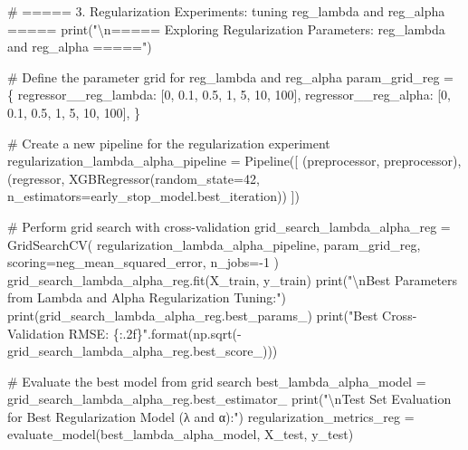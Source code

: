 \documentclass[
  letterpaper,
  DIV=11,
  numbers=noendperiod]{scrreprt}
\newenvironment{Shaded}{\begin{snugshade}}{\end{snugshade}}
\newcommand{\BuiltInTok}[1]{\textcolor[rgb]{0.00,0.23,0.31}{#1}}
\newcommand{\CharTok}[1]{\textcolor[rgb]{0.13,0.47,0.30}{#1}}
\newcommand{\CommentTok}[1]{\textcolor[rgb]{0.37,0.37,0.37}{#1}}
\newcommand{\DecValTok}[1]{\textcolor[rgb]{0.68,0.00,0.00}{#1}}
\newcommand{\FloatTok}[1]{\textcolor[rgb]{0.68,0.00,0.00}{#1}}
\newcommand{\NormalTok}[1]{\textcolor[rgb]{0.00,0.23,0.31}{#1}}
\newcommand{\OperatorTok}[1]{\textcolor[rgb]{0.37,0.37,0.37}{#1}}
\newcommand{\SpecialCharTok}[1]{\textcolor[rgb]{0.37,0.37,0.37}{#1}}
\newcommand{\StringTok}[1]{\textcolor[rgb]{0.13,0.47,0.30}{#1}}
\begin{document}
\begin{Shaded}
\begin{Highlighting}[]
\CommentTok{\# ===== 3. Regularization Experiments: tuning reg\_lambda and reg\_alpha =====}
\BuiltInTok{print}\NormalTok{(}\StringTok{"}\CharTok{\textbackslash{}n}\StringTok{===== Exploring Regularization Parameters: reg\_lambda and reg\_alpha ====="}\NormalTok{)}

\CommentTok{\# Define the parameter grid for reg\_lambda and reg\_alpha}
\NormalTok{param\_grid\_reg }\OperatorTok{=}\NormalTok{ \{}
    \StringTok{\textquotesingle{}regressor\_\_reg\_lambda\textquotesingle{}}\NormalTok{: [}\DecValTok{0}\NormalTok{, }\FloatTok{0.1}\NormalTok{, }\FloatTok{0.5}\NormalTok{, }\DecValTok{1}\NormalTok{, }\DecValTok{5}\NormalTok{, }\DecValTok{10}\NormalTok{, }\DecValTok{100}\NormalTok{],}
    \StringTok{\textquotesingle{}regressor\_\_reg\_alpha\textquotesingle{}}\NormalTok{: [}\DecValTok{0}\NormalTok{, }\FloatTok{0.1}\NormalTok{, }\FloatTok{0.5}\NormalTok{, }\DecValTok{1}\NormalTok{, }\DecValTok{5}\NormalTok{, }\DecValTok{10}\NormalTok{, }\DecValTok{100}\NormalTok{],}
\NormalTok{\}}

\CommentTok{\# Create a new pipeline for the regularization experiment}
\NormalTok{regularization\_lambda\_alpha\_pipeline }\OperatorTok{=}\NormalTok{ Pipeline([}
\NormalTok{    (}\StringTok{\textquotesingle{}preprocessor\textquotesingle{}}\NormalTok{, preprocessor),}
\NormalTok{    (}\StringTok{\textquotesingle{}regressor\textquotesingle{}}\NormalTok{, XGBRegressor(random\_state}\OperatorTok{=}\DecValTok{42}\NormalTok{, n\_estimators}\OperatorTok{=}\NormalTok{early\_stop\_model.best\_iteration))}
\NormalTok{])}

\CommentTok{\# Perform grid search with cross{-}validation}
\NormalTok{grid\_search\_lambda\_alpha\_reg }\OperatorTok{=}\NormalTok{ GridSearchCV(}
\NormalTok{    regularization\_lambda\_alpha\_pipeline,}
\NormalTok{    param\_grid\_reg,}
\NormalTok{    scoring}\OperatorTok{=}\StringTok{\textquotesingle{}neg\_mean\_squared\_error\textquotesingle{}}\NormalTok{,}
\NormalTok{    n\_jobs}\OperatorTok{={-}}\DecValTok{1}
\NormalTok{)}
\NormalTok{grid\_search\_lambda\_alpha\_reg.fit(X\_train, y\_train)}
\BuiltInTok{print}\NormalTok{(}\StringTok{"}\CharTok{\textbackslash{}n}\StringTok{Best Parameters from Lambda and Alpha Regularization Tuning:"}\NormalTok{)}
\BuiltInTok{print}\NormalTok{(grid\_search\_lambda\_alpha\_reg.best\_params\_)}
\BuiltInTok{print}\NormalTok{(}\StringTok{"Best Cross{-}Validation RMSE: }\SpecialCharTok{\{:.2f\}}\StringTok{"}\NormalTok{.}\BuiltInTok{format}\NormalTok{(np.sqrt(}\OperatorTok{{-}}\NormalTok{grid\_search\_lambda\_alpha\_reg.best\_score\_)))}

\CommentTok{\# Evaluate the best model from grid search}
\NormalTok{best\_lambda\_alpha\_model }\OperatorTok{=}\NormalTok{ grid\_search\_lambda\_alpha\_reg.best\_estimator\_}
\BuiltInTok{print}\NormalTok{(}\StringTok{"}\CharTok{\textbackslash{}n}\StringTok{Test Set Evaluation for Best Regularization Model (λ and α):"}\NormalTok{)}
\NormalTok{regularization\_metrics\_reg }\OperatorTok{=}\NormalTok{ evaluate\_model(best\_lambda\_alpha\_model, X\_test, y\_test)}
\end{Highlighting}
\end{Shaded}
\end{document}
